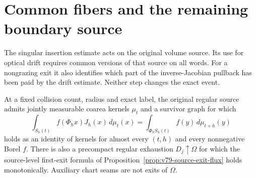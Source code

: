 \section{Common fibers and the remaining boundary source}
\label{sec:v80-boundary}
The singular insertion estimate acts on the original volume source.
Its use for optical drift requires common versions of that source
on all words. For a nongrazing exit it also identifies which part
of the inverse-Jacobian pullback has been paid by the drift estimate.
Neither step changes the exact event.

\begin{lemma}
\label{lem:v80-common-coarea}
At a fixed collision count, radius and exact label, the original
regular source admits jointly measurable coarea kernels $\mu_t$ and
a survivor graph for which
\begin{equation}\label{eq:v80-common-covariance}
 \int_{S_h(t)} f(\Phi_hx)J_h(x)\,d\mu_t(x)
       =\int_{\Phi_h S_h(t)}f(y)\,d\mu_{t+h}(y)
\end{equation}
holds as an identity of kernels for almost every $(t,h)$ and every
nonnegative Borel $f$. There is also a precompact regular exhaustion
$D_j\uparrow\Omega$ for which the source-level first-exit formula
of Proposition~\ref{prop:v79-source-exit-flux} holds monotonically.
Auxiliary chart seams are not exits of $\Omega$.
\end{lemma}

